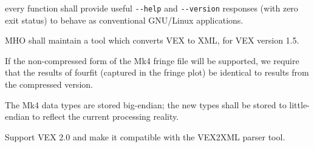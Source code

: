 \begin{description}
 every function shall provide useful
    \verb+--help+ and \verb+--version+ responses (with zero exit status)
    to behave as conventional \acs{GNU/Linux} applications.
    
 \ac{MHO} shall maintain a  tool which converts 
\acs{VEX} to \acs{XML}, for \acs{VEX} version 1.5.

 If the non-compressed form of the \acs{Mk4} fringe file will be 
supported, we require that the results of fourfit (captured in the fringe plot)
be identical to results from the compressed version.

 The \acs{Mk4} data types are stored big-endian; the new types
    shall be stored to little-endian to reflect the current processing
    reality.


 Support \acs{VEX} 2.0 and make it compatible with the
    \acs{VEX2XML} parser tool. %



\end{description}




